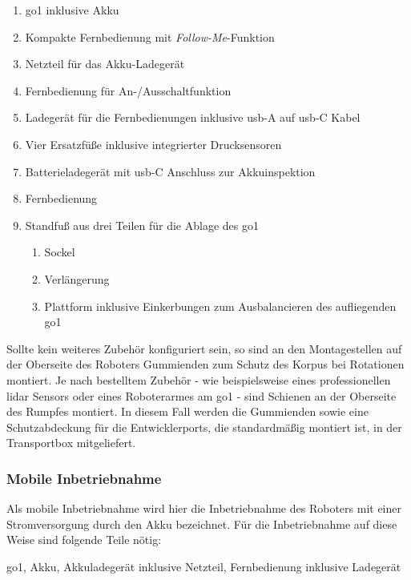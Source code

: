 \begin{enumerate}
    \item \gls{go1} inklusive Akku
    \item Kompakte Fernbedienung mit \emph{Follow-Me}-Funktion
    \item Netzteil für das Akku-Ladegerät
    \item Fernbedienung für An-/Ausschaltfunktion
    \item Ladegerät für die Fernbedienungen inklusive \gls{usb}-A auf \gls{usb}-C Kabel
    \item Vier Ersatzfüße inklusive integrierter Drucksensoren
    \item Batterieladegerät mit \gls{usb}-C Anschluss zur Akkuinspektion
    \item Fernbedienung
    \item Standfuß aus drei Teilen für die Ablage des \gls{go1}
    \begin{enumerate}
        \item Sockel
        \item Verlängerung
        \item Plattform inklusive Einkerbungen zum Ausbalancieren des aufliegenden \gls{go1}
    \end{enumerate}
\end{enumerate}

Sollte kein weiteres Zubehör konfiguriert sein, so sind an den Montagestellen auf der Oberseite des Roboters Gummienden
zum Schutz des Korpus bei Rotationen montiert.
Je nach bestelltem Zubehör - wie beispielsweise eines professionellen \gls{lidar} Sensors oder eines
Roboterarmes am \gls{go1} - sind Schienen an der Oberseite des Rumpfes montiert.
In diesem Fall werden die Gummienden sowie eine Schutzabdeckung für die Entwicklerports, die standardmäßig montiert ist,
in der Transportbox mitgeliefert.

\subsubsection{Mobile Inbetriebnahme}
\label{subsubsec:inbetriebnahme_akku}

Als mobile Inbetriebnahme wird hier die Inbetriebnahme des Roboters mit einer Stromversorgung durch den Akku bezeichnet.
Für die Inbetriebnahme auf diese Weise sind folgende Teile nötig:

\begin{requirements}
    \gls{go1}, Akku, Akkuladegerät inklusive Netzteil, Fernbedienung inklusive Ladegerät
\end{requirements}

